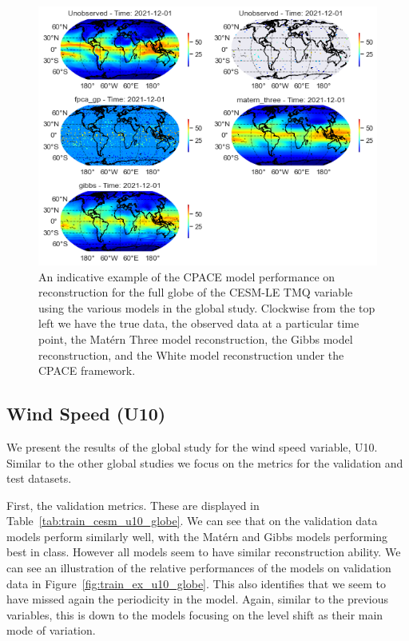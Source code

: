 \begin{figure}
	\centering
	\includegraphics[width=\textwidth]{full_ex_tmq_globe}
	\caption{An indicative example of the CPACE model performance on reconstruction for the full globe of the CESM-LE TMQ variable using the various models in the global study. Clockwise from the top left we have the true data, the observed data at a particular time point, the Mat\'ern Three model reconstruction, the Gibbs model reconstruction, and the White model reconstruction under the CPACE framework.}
	\label{fig:full_ex_tmq_globe}
\end{figure}


\subsection{Wind Speed (U10)\label{ssec:cesm_u10}}
We present the results of the global study for the wind speed variable, U10.
Similar to the other global studies we focus on the metrics for the validation and test datasets.

First, the validation metrics.
These are displayed in Table~\ref{tab:train_cesm_u10_globe}.
We can see that on the validation data models perform similarly well, with the Mat\'ern and Gibbs models performing best in class.
However all models seem to have similar reconstruction ability.
We can see an illustration of the relative performances of the models on validation data in Figure~\ref{fig:train_ex_u10_globe}.
This also identifies that we seem to have missed again the periodicity in the model.
Again, similar to the previous variables, this is down to the models focusing on the level shift as their main mode of variation.

